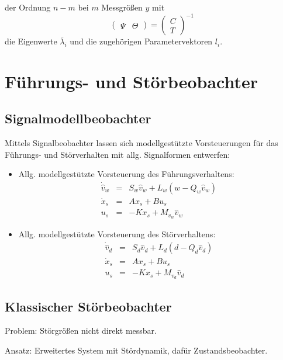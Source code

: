 der Ordnung $n-m$ bei $m$ Messgrößen $y$ mit
\begin{equation}
    \begin{pmatrix} \Psi & \Theta \end{pmatrix} =
    {\begin{pmatrix} C \\ T \end{pmatrix}}^{-1}
\end{equation}
die Eigenwerte $\bar{\lambda}_i$ und die zugehörigen Parametervektoren $l_i$. 

\section{Führungs- und Störbeobachter}
\subsection{Signalmodellbeobachter}
Mittels Signalbeobachter lassen sich modellgestützte Vorsteuerungen für das Führungs- und Störverhalten mit allg.
Signalformen entwerfen:
\begin{itemize}
    \item Allg. modellgestützte Vorsteuerung des Führungsverhaltens:
        \begin{eqnarray}
            \dot{\hat{v}}_w &=& S_w \hat{v}_w + L_w (w-Q_w \hat{v}_w) \\
            \dot{x}_s &=& A x_s + B u_s \\
            u_s &=& -K x_s + M_{v_w} \hat{v}_w
        \end{eqnarray}
    \item Allg. modellgestützte Vorsteuerung des Störverhaltens:
        \begin{eqnarray}
            \dot{\hat{v}}_d &=& S_d \hat{v}_d + L_d (d-Q_d \hat{v}_d) \\
            \dot{x}_s &=& A x_s + B u_s \\
            u_s &=& -K x_s + M_{v_d} \hat{v}_d
        \end{eqnarray}
\end{itemize}

\subsection{Klassischer Störbeobachter}
Problem: Störgrößen nicht direkt messbar.

Ansatz: Erweitertes System mit Stördynamik, dafür Zustandsbeobachter.

